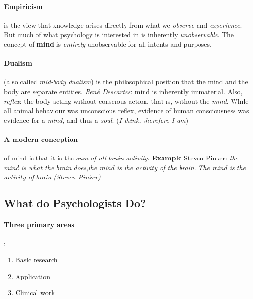 \documentclass{article}
\begin{document}
	\paragraph{Empiricism} is the view that knowledge arises directly from what we \emph{observe} and \emph{experience}.
	\newline But much of what psychology is interested in is inherently \emph{unobservable}.
	\newline The concept of \textbf{mind} is \emph{entirely} unobservable for all intents and purposes.
	\paragraph{Dualism}(also called \emph{mid-body dualism}) is the philosophical position that the mind and the body are separate entities.
	\newline \emph{René Descartes}: mind is inherently immaterial.
	\newline Also, \emph{reflex}: the body acting without conscious action, that is, without the \emph{mind}.
	\newline While all animal behaviour was unconscious reflex, evidence of human consciousness was evidence for a \emph{mind}, and thus a \emph{soul}. (\emph{I think, therefore I am})
	\paragraph{A modern conception} of mind is that it is the \emph{sum of all brain activity}.
	\newline \textbf{Example} Steven Pinker: \emph{the mind is what the brain does},\emph{the mind is the activity of the brain}.
	\newline \emph{The mind is the activity of brain (Steven Pinker)}
	\subsection{What do Psychologists Do?}
	\paragraph{Three primary areas}:
	\begin{enumerate}
		\item Basic research
		\item Application
		\item Clinical work
	\end{enumerate}
\end{document}

